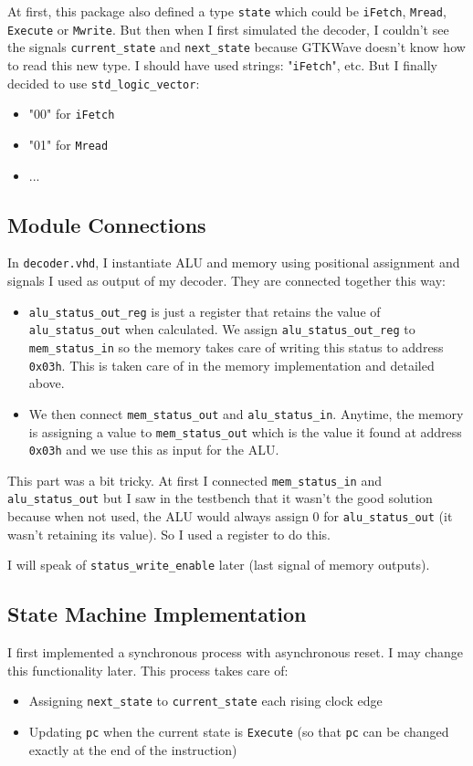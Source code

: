 At first, this package also defined a type \texttt{state} which could be \texttt{iFetch}, \texttt{Mread}, \texttt{Execute} or \texttt{Mwrite}. But then when I first simulated the decoder, I couldn't see the signals \texttt{current\_state} and \texttt{next\_state} because GTKWave doesn't know how to read this new type. I should have used strings: "\texttt{iFetch}", etc. But I finally decided to use \texttt{std\_logic\_vector}:
\begin{itemize}
    \item "00" for \texttt{iFetch}
    \item "01" for \texttt{Mread}
    \item ...
\end{itemize}

\subsection{Module Connections}
In \texttt{decoder.vhd}, I instantiate ALU and memory using positional assignment and signals I used as output of my decoder. They are connected together this way:

\begin{itemize}
    \item \texttt{alu\_status\_out\_reg} is just a register that retains the value of \texttt{alu\_status\_out} when calculated. We assign \texttt{alu\_status\_out\_reg} to \texttt{mem\_status\_in} so the memory takes care of writing this status to address \texttt{0x03h}. This is taken care of in the memory implementation and detailed above.
    
    \item We then connect \texttt{mem\_status\_out} and \texttt{alu\_status\_in}. Anytime, the memory is assigning a value to \texttt{mem\_status\_out} which is the value it found at address \texttt{0x03h} and we use this as input for the ALU.
\end{itemize}

This part was a bit tricky. At first I connected \texttt{mem\_status\_in} and \texttt{alu\_status\_out} but I saw in the testbench that it wasn't the good solution because when not used, the ALU would always assign 0 for \texttt{alu\_status\_out} (it wasn't retaining its value). So I used a register to do this.

I will speak of \texttt{status\_write\_enable} later (last signal of memory outputs).

\subsection{State Machine Implementation}
I first implemented a synchronous process with asynchronous reset. I may change this functionality later. This process takes care of:
\begin{itemize}
    \item Assigning \texttt{next\_state} to \texttt{current\_state} each rising clock edge
    \item Updating \texttt{pc} when the current state is \texttt{Execute} (so that \texttt{pc} can be changed exactly at the end of the instruction)
\end{itemize}

